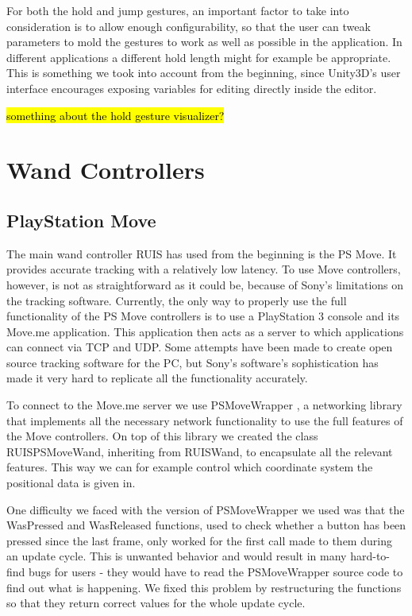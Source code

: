 \documentclass[12pt,a4paper,oneside,pdftex]{report}
\begin{document}
For both the hold and jump gestures, an important factor to take into consideration is to allow enough configurability, so that the user can tweak parameters to mold the gestures to work as well as possible in the application. In different applications a different hold length might for example be appropriate. This is something we took into account from the beginning, since Unity3D's user interface encourages exposing variables for editing directly inside the editor.

\hl{something about the hold gesture visualizer?}

\section{Wand Controllers}
\label{section:wandcontrollers}

\subsection{PlayStation Move}
\label{subsection:wandcontrollers:psmove}

The main wand controller RUIS has used from the beginning is the PS Move. It provides accurate tracking with a relatively low latency. To use Move controllers, however, is not as straightforward as it could be, because of Sony's limitations on the tracking software. Currently, the only way to properly use the full functionality of the PS Move controllers is to use a PlayStation 3 console and its Move.me application. This application then acts as a server to which applications can connect via TCP and UDP. Some attempts have been made to create open source tracking software for the PC, but Sony's software's sophistication has made it very hard to replicate all the functionality accurately.

To connect to the Move.me server we use PSMoveWrapper \cite{PSMoveWrapper}, a networking library that implements all the necessary network functionality to use the full features of the Move controllers. On top of this library we created the class RUISPSMoveWand, inheriting from RUISWand, to encapsulate all the relevant features. This way we can for example control which coordinate system the positional data is given in.

One difficulty we faced with the version of PSMoveWrapper we used was that the WasPressed and WasReleased functions, used to check whether a button has been pressed since the last frame, only worked for the first call made to them during an update cycle. This is unwanted behavior and would result in many hard-to-find bugs for users - they would have to read the PSMoveWrapper source code to find out what is happening. We fixed this problem by restructuring the functions so that they return correct values for the whole update cycle.
\end{document}

